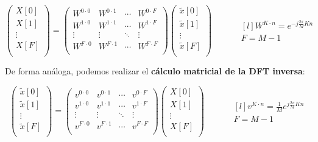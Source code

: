 \documentclass[a4paper,oneside]{book}
\begin{document}
\[ \left( 
\begin{matrix}
	X[0]\\
	X[1]\\
	\vdots \\
	X[F]\\
\end{matrix} \right)
= \left(
\begin{matrix}
	W^{0 \cdot 0} & W^{0 \cdot 1} & \cdots & W^{0 \cdot F}\\
	W^{1 \cdot 0} & W^{1 \cdot 1} & \cdots & W^{1 \cdot F}\\
	\vdots & \vdots & \ddots & \vdots \\
	W^{F \cdot 0} & W^{F \cdot 1} & \cdots & W^{F \cdot F}\\
\end{matrix} \right)
\left( \begin{matrix}
	\tilde{x}[0]\\
	\tilde{x}[1]\\
	\vdots\\
	\tilde{x}[F]\\
\end{matrix} \right)
\qquad \quad 
\begin{matrix*}[l]
	W^{K \cdot n} = e^{-j \frac{2\pi}{M}Kn}\\[5pt]
	F = M - 1
\end{matrix*}
\]

De forma análoga, podemos realizar el \textbf{cálculo matricial de la DFT inversa}:

\[ \left( \begin{matrix}
	\tilde{x}[0]\\
	\tilde{x}[1]\\
	\vdots\\
	\tilde{x}[F]\\
\end{matrix} \right)
= \left(
\begin{matrix}
	v^{0 \cdot 0} & v^{0 \cdot 1} & \cdots & v^{0 \cdot F}\\
	v^{1 \cdot 0} & v^{1 \cdot 1} & \cdots & v^{1 \cdot F}\\
	\vdots & \vdots & \ddots & \vdots \\
	v^{F \cdot 0} & v^{F \cdot 1} & \cdots & v^{F \cdot F}\\
\end{matrix} \right)
\left( 
\begin{matrix}
	X[0]\\
	X[1]\\
	\vdots \\
	X[F]\\
\end{matrix} \right)
\qquad \quad 
\begin{matrix*}[l]
	v^{K \cdot n} = \frac{1}{M} e^{j \frac{2\pi}{M}Kn}\\[5pt]
	F = M - 1
\end{matrix*}
\]
\end{document}

